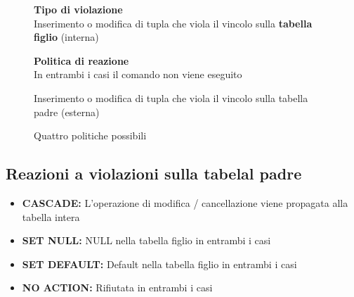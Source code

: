 \begin{figure}[htbp]
    \centering
    \sffamily
    
    \begin{minipage}[c]{0.43\textwidth}
        \textbf{Tipo di violazione}\\
        Inserimento o modifica di tupla che viola il vincolo sulla \textcolor{red!80!black}{\textbf{tabella figlio}} (interna)
    \end{minipage}%
    \begin{minipage}[c]{0.10\textwidth}
        \centering
    \end{minipage}%
    \begin{minipage}[c]{0.43\textwidth}
        \textbf{Politica di reazione}\\
        In entrambi i casi il comando non viene eseguito
    \end{minipage}
\end{figure}
\begin{figure}[htbp]
    \centering
    \sffamily
    
    \begin{minipage}[c]{0.43\textwidth}
        Inserimento o modifica di tupla che viola il vincolo sulla tabella padre (esterna)
    \end{minipage}%
    \begin{minipage}[c]{0.10\textwidth}
        \centering
    \end{minipage}%
    \begin{minipage}[c]{0.43\textwidth}
        Quattro politiche possibili
    \end{minipage}
\end{figure}

\subsection{Reazioni a violazioni sulla tabelal padre}
\begin{itemize}
    \item \textbf{CASCADE:} L'operazione di modifica / cancellazione viene propagata alla tabella intera
    \item \textbf{SET NULL:} NULL nella tabella figlio in entrambi i casi
    \item \textbf{SET DEFAULT:} Default nella tabella figlio in entrambi i casi
    \item \textbf{NO ACTION:} Rifiutata in entrambi i casi
\end{itemize}

